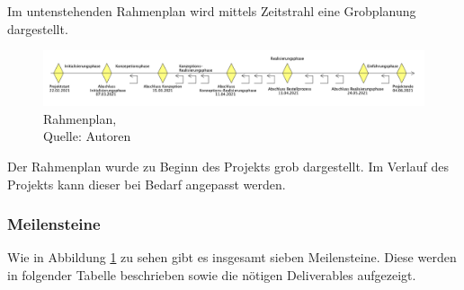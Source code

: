 Im untenstehenden Rahmenplan wird mittels Zeitstrahl eine Grobplanung dargestellt. 

\begin{figure}[H]
    \centering
   \includegraphics[width=1\textwidth]{images/SoDa_Zeitstrahl.png}
    \caption[SoDa Rahmenplan]{Rahmenplan,\\ Quelle: Autoren}
    \label{img: SoDa Rahmenplan}
\end{figure}
Der Rahmenplan wurde zu Beginn des Projekts grob dargestellt. Im Verlauf des Projekts kann dieser bei Bedarf angepasst werden.  
\newpage
\subsubsection{Meilensteine}\label{Meilensteine}
Wie in Abbildung \ref{img: SoDa Rahmenplan} zu sehen gibt es insgesamt sieben Meilensteine.
Diese werden in folgender Tabelle beschrieben sowie die nötigen Deliverables aufgezeigt.


